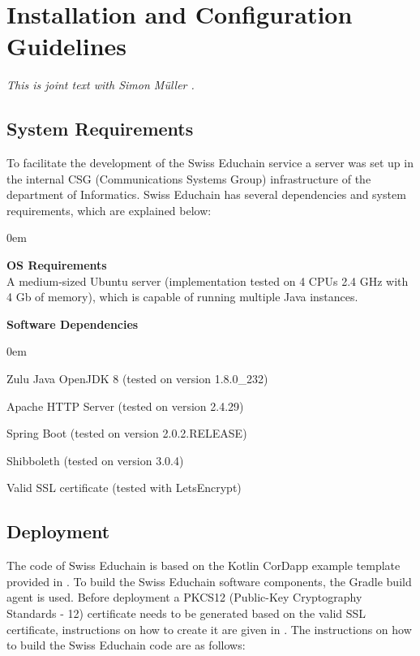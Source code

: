 \appendix

\chapter{Installation and Configuration Guidelines} \label{app:guidelines}

\emph{This is joint text with Simon M{\"u}ller \cite{mueller20}.}

\section{System Requirements}

To facilitate the development of the Swiss Educhain service a server was set up in the internal CSG (Communications Systems Group) infrastructure of the department of Informatics. Swiss Educhain has several dependencies and system requirements, which are explained below:

\begin{description}
	\itemsep0em
	\item\textbf{OS Requirements} \hfill \\ A medium-sized Ubuntu server (implementation tested on 4 CPUs 2.4 GHz with 4 Gb of memory), which is capable of running multiple Java instances.
	\item\textbf{Software Dependencies} \hfill 
	\begin{description}
		\itemsep0em
		\item Zulu Java OpenJDK 8 (tested on version 1.8.0\_232)
		\item Apache HTTP Server (tested on version 2.4.29)
		\item Spring Boot (tested on version 2.0.2.RELEASE)
		\item Shibboleth (tested on version 3.0.4)
		\item Valid SSL certificate (tested with LetsEncrypt)
	\end{description}
\end{description}

\section{Deployment}

The code of Swiss Educhain is based on the Kotlin CorDapp example template provided in \cite{kotlin-cordapp-template}. To build the Swiss Educhain software components, the Gradle build agent is used. Before deployment a PKCS12 (Public-Key Cryptography Standards - 12) certificate needs to be generated based on the valid SSL certificate, instructions on how to create it are given in \cite{java-certificate}. The instructions on how to build the Swiss Educhain code are as follows:


